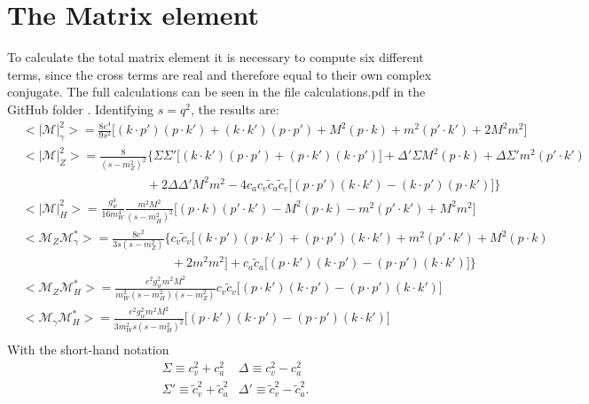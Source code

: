 \documentclass[12pt,letterpaper]{article}
\newcommand{\avg}[1]{\big<#1\big>}
\begin{document}
\section{The Matrix element}
To calculate the total matrix element it is necessary to compute six different terms, since the cross terms are real and therefore equal to their own complex conjugate. The full calculations can be seen in the file calculations.pdf in the GitHub folder \cite{github}. Identifying $s=q^2$, the results are:
\begin{align*}
&\avg{|\mathcal{M}|_{\gamma}^2} = \frac{8e^4}{9 s^2} \big[ (k\cdot p')(p\cdot k')  +(k\cdot k')(p\cdot p') + M^2(p\cdot k) + m^2(p'\cdot k') + 2M^2m^2 \big]\\
&\avg{|\mathcal{M}|_{Z}^2} = \frac{8}{(s-m_Z^2)^2}
\big\{ 
\Sigma\Sigma' \big[ (k\cdot k')(p\cdot p') + (p\cdot k')(k\cdot p') \big]
+ \Delta'\Sigma M^2(p\cdot k)
+\Delta\Sigma'm^2(p'\cdot k')\\
&\qquad\qquad\qquad\qquad\qquad
+2\Delta\Delta'M^2m^2
-4c_ac_v\tilde{c}_a\tilde{c}_v\big[ (p\cdot p')(k\cdot k') - (k\cdot p')(p\cdot k') \big]
\big\}\\
&\avg{|\mathcal{M}|_{H}^2} = \frac{g_w^4}{16m_W^4}\frac{m^2M^2}{(s-m_H^2)^2}
\big[ (p\cdot k)(p'\cdot k') - M^2(p\cdot k) - m^2(p'\cdot k') + M^2m^2 \big]\\
&\avg{\mathcal{M}_Z \mathcal{M}_{\gamma}^*}=\frac{8e^2}{3s(s-m_Z^2)}
\big\{
c_v\tilde{c}_v\big[ (k\cdot p')(p\cdot k') + (p\cdot p')(k\cdot k') + m^2(p'\cdot k') + M^2(p\cdot k) \\
&\qquad\qquad\qquad\qquad\qquad\qquad+ 2m^2m^2 \big] + c_a\tilde{c}_a\big[ (p\cdot k')(k\cdot p')-(p\cdot p')(k\cdot k') \big]
\big\}	\\
&\avg{\mathcal{M}_Z\mathcal{M}_H^*}=\frac{e^2g_w^2m^2M^2}{m_W^2(s-m_H^2)(s-m_Z^2)}c_v\tilde{c}_v
\big[ (p\cdot k')(k\cdot p') - (p\cdot p')(k\cdot k') \big]\\
&\avg{\mathcal{M}_{\gamma}\mathcal{M}_H^*}=\frac{e^2g_w^2m^2M^2}{3m_W^2s(s-m_H^2)^2}\big[ (p\cdot k')(k\cdot p') - (p\cdot p')(k\cdot k') \big]\\
\end{align*}
With the short-hand notation
\begin{align*}
&\Sigma \equiv c_v^2 + c_a^2  &\Delta \equiv c_v^2 - c_a^2\\
&\Sigma' \equiv \tilde{c}_v^2 + \tilde{c}_a^2 &\Delta'\equiv \tilde{c}_v^2 - \tilde{c}_a^2.
\end{align*}
\end{document}
